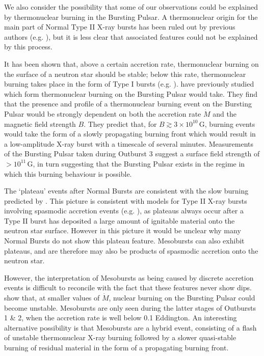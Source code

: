\par We also consider the possibility that some of our observations could be explained by thermonuclear burning in the Bursting Pulsar.  A thermonuclear origin for the main part of Normal Type II X-ray bursts has been ruled out by previous authors (e.g. \citealp{Lewin_BP}), but it is less clear that associated features could not be explained by this process.
\par It has been shown that, above a certain accretion rate, thermonuclear burning on the surface of a neutron star should be stable; below this rate, thermonuclear burning takes place in the form of Type I bursts (e.g. \citealp{Fujimoto_Shellstab,Bildsten_Regimes}).  \citet{Bildsten_Nuclear} have previously studied which form thermonuclear burning on the Bursting Pulsar would take.  They find that the presence and profile of a thermonuclear burning event on the Bursting Pulsar would be strongly dependent on both the accretion rate $\dot{M}$ and the magnetic field strength $B$.  They predict that, for $B\gtrsim3\times10^{10}$\,G, burning events would take the form of a slowly propagating burning front which would result in a low-amplitude X-ray burst with a timescale of several minutes.  Measurements of the Bursting Pulsar taken during Outburst 3 suggest a surface field strength of $>10^{11}$\,G, in turn suggesting that the Bursting Pulsar exists in the regime in which this burning behaviour is possible.
\par The `plateau' events after Normal Bursts are consistent with the slow burning predicted by \citet{Bildsten_Nuclear}.  This picture is consistent with models for Type II X-ray bursts involving spasmodic accretion events (e.g. \citealp{Spruit_Type2Mod,Walker_Type2Mod}), as plateaus always occur after a Type II burst has deposited a large amount of ignitable material onto the neutron star surface.  However in this picture it would be unclear why many Normal Bursts do not show this plateau feature.  Mesobursts can also exhibit plateaus, and are therefore may also be products of spasmodic accretion onto the neutron star.
\par However, the interpretation of Mesobursts as being caused by discrete accretion events is difficult to reconcile with the fact that these features never show dips.  \citet{Bildsten_Nuclear} show that, at smaller values of $\dot{M}$, nuclear burning on the Bursting Pulsar could become unstable.  Mesobursts are only seen during the latter stages of Outbursts 1 \& 2, when the accretion rate is well below 0.1 Eddington.  An interesting alternative possibility is that Mesobursts are a hybrid event, consisting of a flash of unstable thermonuclear X-ray burning followed by a slower quasi-stable burning of residual material in the form of a propagating burning front.
